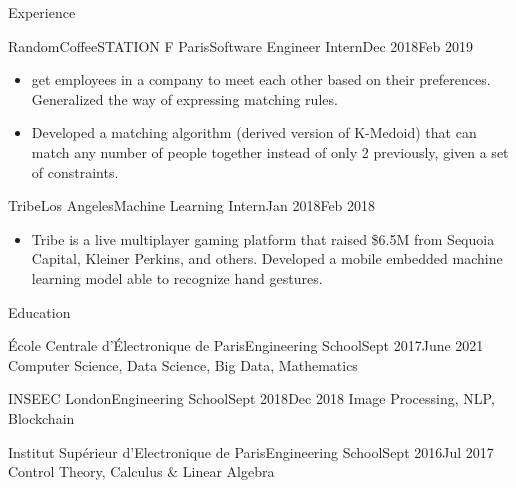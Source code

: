 \documentclass{resume}
\begin{document}
\begin{rSection}{Experience}
		\begin{job}{RandomCoffee}{STATION F Paris}{Software Engineer Intern}{Dec 2018}{Feb 2019}{
            \begin{itemize}
                \item {} get employees in a company to meet each other based on their preferences. Generalized the way of expressing matching rules.
                \item Developed a matching algorithm (derived version of K-Medoid) that can match any number of people together instead of only 2 previously, given a set of constraints.
            \end{itemize}
		}
		\end{job}

		\begin{job}{Tribe}{Los Angeles}{Machine Learning Intern}{Jan 2018}{Feb 2018}{
            \begin{itemize}
                \item Tribe is a live multiplayer gaming platform that raised \$6.5M from Sequoia Capital, Kleiner Perkins, and others. Developed a mobile embedded machine learning model able to recognize hand gestures.
            \end{itemize}
		}
		\end{job}
	\end{rSection}

    \begin{rSection}{Education}
        \begin{school}{École Centrale d'Électronique de Paris}{Engineering School}{Sept 2017}{June 2021}{
            Computer Science, Data Science, Big Data, Mathematics
        }
        \end{school}

        \begin{school}{INSEEC London}{Engineering School}{Sept 2018}{Dec 2018}{
            Image Processing, NLP, Blockchain
        }
        \end{school}

        \begin{school}{Institut Supérieur d'Electronique de Paris}{Engineering School}{Sept 2016}{Jul 2017}{
            Control Theory, Calculus \& Linear Algebra
        }
        \end{school}
    \end{rSection}
\end{document}

